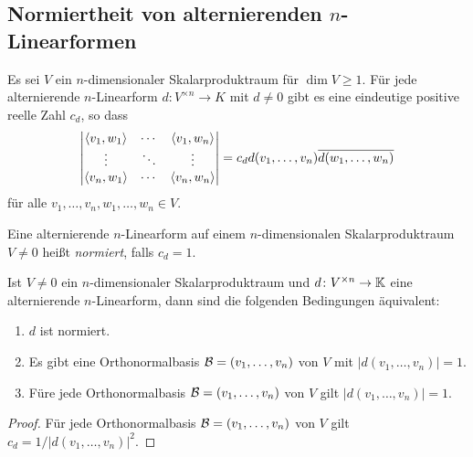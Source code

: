 \subsection{Normiertheit von alternierenden \texorpdfstring{$n$}{n}-Linearformen}


\begin{theorem}
  Es sei $V$ ein $n$-dimensionaler Skalarproduktraum für $\dim V \geq 1$.
  Für jede alternierende $n$-Linearform $d \colon V^{\times n} \to K$ mit $d \neq 0$ gibt es eine eindeutige positive reelle Zahl $c_d$, so dass
  \[
    \left|
      \begin{matrix}
        \left\langle v_1, w_1 \right\rangle  & \cdots  & \left\langle v_1, w_n \right\rangle  \\
        \vdots              & \ddots  & \vdots              \\
        \left\langle v_n, w_1 \right\rangle  & \cdots  & \left\langle v_n, w_n \right\rangle
      \end{matrix}
    \right|
    =
    c_d d(v_1, \dotsc, v_n) \overline{ d(w_1, \dotsc, w_n) }
  \]
  für alle $v_1, \dotsc, v_n, w_1, \dotsc, w_n \in V$.
\end{theorem}


\begin{definition}
  Eine alternierende $n$-Linearform auf einem $n$-dimensionalen Skalarproduktraum $V \neq 0$ heißt \emph{normiert}, falls $c_d = 1$.
\end{definition}


\begin{lemma}
  Ist $V \neq 0$ ein $n$-dimensionaler Skalarproduktraum und $d \colon V^{\times n} \to \mathbb{K}$ eine alternierende $n$-Linearform, dann sind die folgenden Bedingungen äquivalent:
  \begin{enumerate}[leftmargin=*, label=\roman*)]
    \item
      $d$ ist normiert.
    \item
      Es gibt eine Orthonormalbasis $\mathcal{B} = (v_1, \dotsc, v_n)$ von $V$ mit $|d(v_1, \dotsc, v_n)| = 1$.
    \item
      Füre jede Orthonormalbasis $\mathcal{B} = (v_1, \dotsc, v_n)$ von $V$ gilt $|d(v_1, \dotsc, v_n)| = 1$.
  \end{enumerate}
\end{lemma}


\begin{proof}
  Für jede Orthonormalbasis $\mathcal{B} = (v_1, \dotsc, v_n)$ von $V$ gilt $c_d = 1/|d(v_1, \dotsc, v_n)|^2$.
\end{proof}


